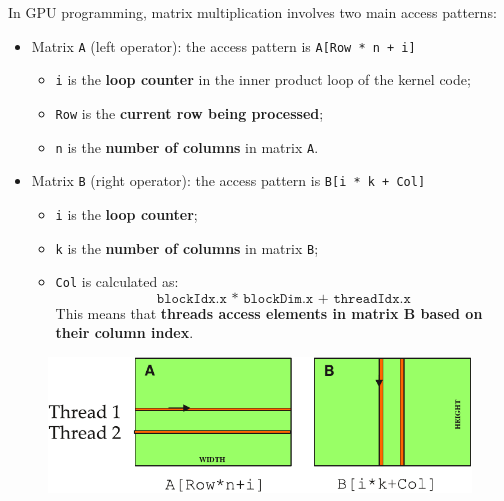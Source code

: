 \noindent
In GPU programming, matrix multiplication involves two main access patterns:
\begin{itemize}
    \item Matrix \texttt{A} (left operator): the access pattern is \texttt{A[Row * n + i]}
    \begin{itemize}
        \item \texttt{i} is the \textbf{loop counter} in the inner product loop of the kernel code;
        \item \texttt{Row} is the \textbf{current row being processed};
        \item \texttt{n} is the \textbf{number of columns} in matrix \texttt{A}.
    \end{itemize}

    \item Matrix \texttt{B} (right operator): the access pattern is \texttt{B[i * k + Col]}
    \begin{itemize}
        \item \texttt{i} is the \textbf{loop counter};
        \item \texttt{k} is the \textbf{number of columns} in matrix \texttt{B};
        \item \texttt{Col} is calculated as:
        \begin{equation*}
            \texttt{blockIdx.x * blockDim.x + threadIdx.x}
        \end{equation*}
        This means that \textbf{threads access elements in matrix B based on their column index}.
    \end{itemize}
\end{itemize}
\begin{figure}[!htp]
    \centering
    \includegraphics[width=.6\textwidth]{img/cuda-linear-memory-space-2.pdf}
\end{figure}

